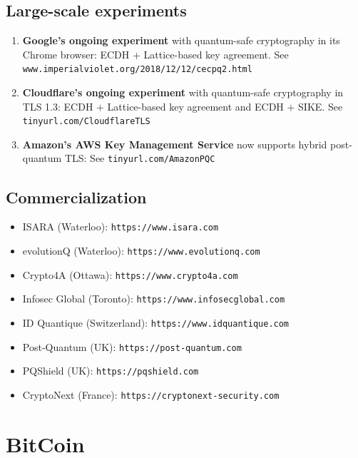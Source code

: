 \documentclass[12pt,titlepage]{article}
\let\stdsection\section
\renewcommand\section{\clearpage\stdsection}
\begin{document}
\subsection{Large-scale experiments}
\begin{enumerate}
	\item \textbf{Google’s ongoing experiment} with quantum-safe cryptography in its Chrome browser: ECDH + Lattice-based key agreement. See \texttt{www.imperialviolet.org/2018/12/12/cecpq2.html}
	\item \textbf{Cloudﬂare’s ongoing experiment} with quantum-safe cryptography in TLS 1.3: ECDH $+$ Lattice-based key agreement and ECDH $+$ SIKE. See \texttt{tinyurl.com/CloudflareTLS}
	\item \textbf{Amazon’s AWS Key Management Service} now supports hybrid post-quantum TLS: See \texttt{tinyurl.com/AmazonPQC}
\end{enumerate}
\subsection{Commercialization}
\begin{itemize}
	\item ISARA (Waterloo): \texttt{https://www.isara.com}
	\item evolutionQ (Waterloo): \texttt{https://www.evolutionq.com}
	\item Crypto4A (Ottawa): \texttt{https://www.crypto4a.com}
	\item Infosec Global (Toronto): \texttt{https://www.infosecglobal.com}
	\item ID Quantique (Switzerland): \texttt{https://www.idquantique.com}
	\item Post-Quantum (UK): \texttt{https://post-quantum.com}
	\item PQShield (UK): \texttt{https://pqshield.com}
	\item CryptoNext (France): \texttt{https://cryptonext-security.com}
\end{itemize}

\section{BitCoin}
\end{document}
